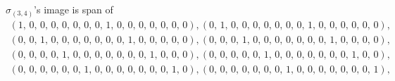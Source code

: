 \documentclass[8pt]{article}\usepackage{amsmath}
\begin{document}
\( \sigma_{(3, 4)}\)'s image is span of   
\begin{align*} \left(1,\,0,\,0,\,0,\,0,\,0,\,0,\,0,\,1,\,0,\,0,\,0,\,0,\,0,\,0,\,0\right) , \left(0,\,1,\,0,\,0,\,0,\,0,\,0,\,0,\,0,\,1,\,0,\,0,\,0,\,0,\,0,\,0\right) , \\ 
 \left(0,\,0,\,1,\,0,\,0,\,0,\,0,\,0,\,0,\,0,\,1,\,0,\,0,\,0,\,0,\,0\right) , \left(0,\,0,\,0,\,1,\,0,\,0,\,0,\,0,\,0,\,0,\,0,\,1,\,0,\,0,\,0,\,0\right) , \\ 
 \left(0,\,0,\,0,\,0,\,1,\,0,\,0,\,0,\,0,\,0,\,0,\,0,\,1,\,0,\,0,\,0\right) , \left(0,\,0,\,0,\,0,\,0,\,1,\,0,\,0,\,0,\,0,\,0,\,0,\,0,\,1,\,0,\,0\right) , \\ 
 \left(0,\,0,\,0,\,0,\,0,\,0,\,1,\,0,\,0,\,0,\,0,\,0,\,0,\,0,\,1,\,0\right) , \left(0,\,0,\,0,\,0,\,0,\,0,\,0,\,1,\,0,\,0,\,0,\,0,\,0,\,0,\,0,\,1\right) , \\ \end{align*}
\end{document}
